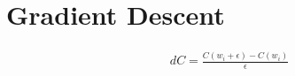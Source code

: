 \documentclass{article}
\begin{document}
\section{Gradient Descent}

\begin{align}
  dC = \frac{C(w_i + \epsilon) - C(w_i)} {\epsilon}
\end{align}
\end{document}
